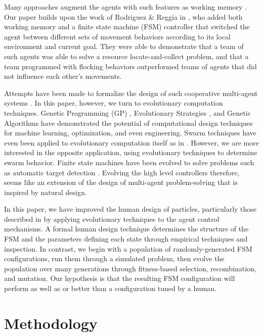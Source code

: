 \documentclass[12pt,journal,compsoc]{IEEEtran}
\begin{document}
Many approaches augment the agents with such features as working memory \cite{winder2012role,hu2003particle}. Our paper builds upon the work of Rodriguez & Reggia in \cite{rodriguez2004extending}, who added both working memory and a finite state machine (FSM) controller that switched the agent between different sets of movement behaviors according to its local environment and current goal. They were able to demonstrate that a team of such agents was able to solve a resource locate-and-collect problem, and that a team programmed with flocking behaviors outperformed teams of agents that did not influence each other's movements.

Attempts have been made to formalize the design of such cooperative multi-agent systems \cite{mataric1993designing,capera2003amas}. In this paper, however, we turn to evolutionary computation techniques. Genetic Programming (GP) \cite{koza1992genetic}, Evolutionary Strategies \cite{rechenberg1989evolution}, and Genetic Algorithms \cite{goldberg1988genetic} have demonstrated the potential of computational design techniques for machine learning, optimization, and even engineering. Swarm techniques have even been applied to evolutionary computation itself as in  \cite{wei2002swarm,miranda2005evolutionary}. However, we are more interested in the opposite application, using evolutionary techniques to determine swarm behavior. Finite state machines have been evolved to solve problems such as automatic target detection \cite{benson2000evolving}. Evolving the high level controllers therefore, seems like an extension of the design of multi-agent problem-solving that is inspired by natural design.

In this paper, we have improved the human design of particles, particularly those described in \cite{rodriguez2004extending} by applying evolutionary techniques to the agent control mechanisms. A formal human design technique determines the structure of the FSM and the parameters defining each state through empirical techniques and inspection. In contrast, we begin with a population of randomly-generated FSM configurations, run them through a simulated problem, then evolve the population over many generations through fitness-based selection, recombination, and mutation. Our hypothesis is that the resulting FSM configuration will perform as well as or better than a configuration tuned by a human.

\section{Methodology}
\end{document}
